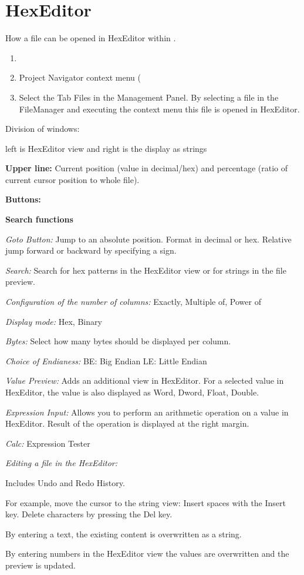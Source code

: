 \section{HexEditor}\label{sec:hexeditor}

How a file can be opened in HexEditor within \codeblocks.

\begin{enumerate}
\item {}
\item Project Navigator context menu (
\item Select the Tab Files in the Management Panel. By selecting a file in the FileManager and executing the context menu  this file is opened in HexEditor.
\end{enumerate}

Division of windows:

left is HexEditor view and right is the display as strings

\textbf{Upper line:}
Current position (value in decimal/hex) and percentage (ratio of current cursor position to whole file).

\textbf{Buttons:}

\textbf{Search functions}

\textit{Goto Button:}
Jump to an absolute position. Format in decimal or hex. Relative jump forward or backward by specifying a sign.

\textit{Search:}
Search for hex patterns in the HexEditor view or for strings in the file preview.

\textit{Configuration of the number of columns:}
Exactly, Multiple of, Power of

\textit{Display mode:}
Hex, Binary

\textit{Bytes:}
Select how many bytes should be displayed per column.

\textit{Choice of Endianess:}
BE: Big Endian
LE: Little Endian

\textit{Value Preview:}
Adds an additional view in HexEditor. For a selected value in HexEditor, the value is also displayed as Word, Dword, Float, Double.

\textit{Expression Input:}
Allows you to perform an arithmetic operation on a value in HexEditor. Result of the operation is displayed at the right margin.

\textit{Calc:}
Expression Tester

\textit{Editing a file in the HexEditor:}

Includes Undo and Redo History.

For example, move the cursor to the string view:
Insert spaces with the Insert key.
Delete characters by pressing the Del key.

By entering a text, the existing content is overwritten as a string.

By entering numbers in the HexEditor view the values are overwritten and the preview is updated.

